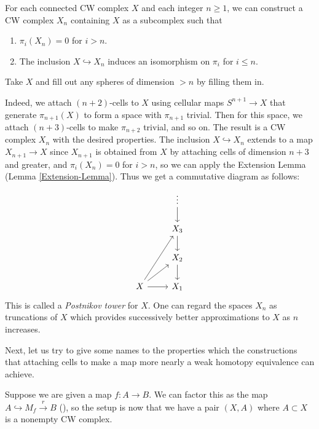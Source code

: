 \begin{example}\label{Postnikov-Towers}
    For each connected CW complex $X$ and each
    integer $n\ge 1$, we can construct a 
    CW complex $X_n$ containing $X$ as a subcomplex such that
    \begin{enumerate}
        \item $\pi_i \left( X_n \right) = 0$ for $i>n$.
        \item The inclusion $X \hookrightarrow X_n$ induces
            an isomorphism on $\pi_i$ for $i\le n$.
    \end{enumerate}
    
    \begin{idea}
        Take $X$ and fill out any spheres of dimension
        $>n$ by filling them in.
    \end{idea}
    Indeed, we attach $(n+2)$-cells to
    $X$ using cellular maps $S^{n+1} \to X$ that
    generate $\pi_{n+1}(X)$ to form a 
    space with $\pi_{n+1}$ trivial. Then
    for this space, we attach $(n+3)$-cells to
    make $\pi_{n+2}$ trivial, and so on. The result
    is a CW complex $X_n$ with the desired properties.
    The inclusion $X \hookrightarrow X_n$ extends
    to a map $X_{n+1} \to X$ since
    $X_{n+1}$ is obtained from $X$ by attaching cells
    of dimension $n+3$ and greater, and
    $\pi_i (X_n) = 0$ for $i>n$, so we
    can apply the Extension Lemma (Lemma \ref{Extension-Lemma}).
    Thus we get a commutative diagram as follows:
    \begin{equation*}
    \begin{tikzcd}
        & \vdots \ar[d] \\
        & X_3 \ar[d] \\
        & X_2 \ar[d] \\
        X \ar[r] \ar[ru] \ar[ruu] & X_1
    \end{tikzcd}
    \end{equation*}
    This is called a \textit{Postnikov tower} for $X$.
    One can regard the spaces $X_n$ as truncations of
    $X$ which provides successively better approximations
    to $X$ as $n$ increases.
    


\end{example}


Next, let us try to give some names to the
properties which the constructions that attaching
cells to make a map more nearly a weak homotopy equivalence
can achieve. 

Suppose we are given a map $f \colon A \to B$.
We can factor this as the map
$A \hookrightarrow M_f \stackrel{r}{\to} B$ (\cite[433]{Bredon}),
so the setup is now that
we have a pair $(X,A)$ where
$A \subset X$ is a nonempty CW complex.

